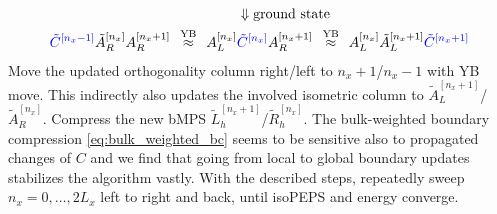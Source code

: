 \begin{enumerate}
\begin{align}
\begin{split}
	&\Downarrow \text{ground state} \\
	\textcolor{blue}{\tilde{C}^{[n_x-1]}} \tilde{A}_R^{[n_x]} A_R^{[n_x+1]} 
	\:\: \overset{\text{YB}}{\approx} \:\:
	A_L^{[n_x]} &\textcolor{blue}{\tilde{C}^{[n_x]}} A_R^{[n_x+1]} 
	\:\: \overset{\text{YB}}{\approx } \:\:
	A_L^{[n_x]} \tilde{A}_L^{[n_x+1]} \textcolor{blue}{\tilde{C}^{[n_x+1]}}
\end{split}
\end{align}
Move the updated orthogonality column right/left to $n_x+1$/$n_x-1$ with YB move. This indirectly also updates the involved isometric column to $\tilde{A}_L^{[n_x+1]}$/$\tilde{A}_R^{[n_x]}$. Compress the new bMPS $\tilde{L}_h^{[n_x+1]}$/$\tilde{R}_h^{[n_x]}$. The bulk-weighted boundary compression \eqref{eq:bulk_weighted_bc} seems to be sensitive also to propagated changes of $C$ and we find that going from local to global boundary updates stabilizes the algorithm vastly. With the described steps, repeatedly sweep $n_x = 0, \ldots, 2L_x$ left to right and back, until isoPEPS and energy converge. 


\end{enumerate}
